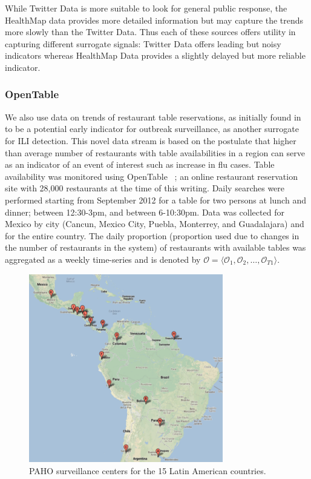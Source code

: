 While Twitter Data is more suitable to look for general public response, the
HealthMap data provides more detailed information but may capture the trends
more slowly than the Twitter Data. Thus each of these sources offers utility in
capturing different surrogate signals: Twitter Data offers leading but noisy
indicators whereas HealthMap Data provides a slightly delayed but more reliable
indicator.

\subsubsection{OpenTable}
We also use data on trends of restaurant table reservations, as initially 
found in~\cite{elaine2013opentable} to be a potential early indicator for
outbreak surveillance, as another surrogate for ILI detection.
This novel data stream is based on the
postulate that higher than average number of restaurants with table
availabilities in a region can serve as an indicator of an event of interest
such as increase in flu cases. Table availability was monitored using OpenTable
~\cite{Opentable:2013}; an online restaurant reservation site with 28,000 restaurants at the time
of this writing. Daily searches were performed starting from September 2012 for
a table for two persons at lunch and dinner; between 12:30-3pm, and between
6-10:30pm. Data was collected for Mexico by city (Cancun, Mexico City, Puebla,
Monterrey, and Guadalajara) and for the entire country. The daily proportion
(proportion used due to changes in the number of restaurants in the system) of
restaurants with available tables was aggregated as a weekly time-series and
is denoted by 
$\mathcal{O} = \langle \mathcal{O}_1, \mathcal{O}_2, \dots, \mathcal{O}_{T1} \rangle$.


\begin{figure} 
  \includegraphics[width=3.33in]{fig/humidity_centers.pdf}
  \caption{\label{fig:surveillance} PAHO surveillance centers for the 15 Latin
  American countries.}
\end{figure}

